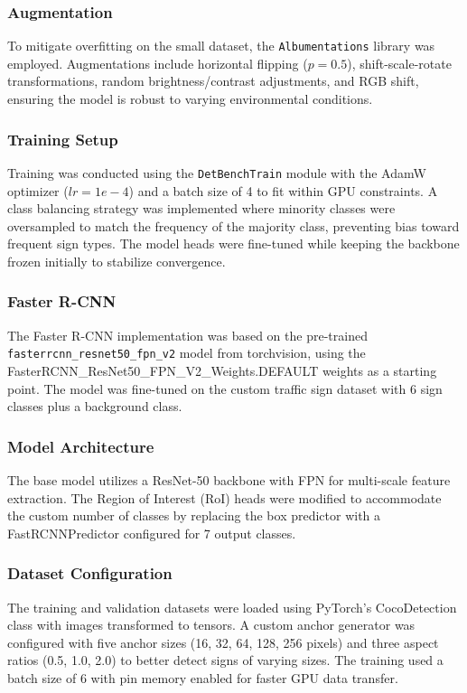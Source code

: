\documentclass{article}
\begin{document}
\subsubsection*{Augmentation}
To mitigate overfitting on the small dataset, the \texttt{Albumentations} library was employed. Augmentations include horizontal flipping ($p=0.5$), shift-scale-rotate transformations, random brightness/contrast adjustments, and RGB shift, ensuring the model is robust to varying environmental conditions.

\subsubsection*{Training Setup}
Training was conducted using the \texttt{DetBenchTrain} module with the AdamW optimizer ($lr=1e-4$) and a batch size of 4 to fit within GPU constraints. A class balancing strategy was implemented where minority classes were oversampled to match the frequency of the majority class, preventing bias toward frequent sign types. The model heads were fine-tuned while keeping the backbone frozen initially to stabilize convergence.

\subsubsection{Faster R-CNN}

The Faster R-CNN implementation was based on the pre-trained \texttt{fasterrcnn\_resnet50\_fpn\_v2} model from torchvision, using the FasterRCNN\_ResNet50\_FPN\_V2\_Weights.DEFAULT weights as a starting point. The model was fine-tuned on the custom traffic sign dataset with 6 sign classes plus a background class.

\subsubsection*{Model Architecture}
The base model utilizes a ResNet-50 backbone with FPN for multi-scale feature extraction. The Region of Interest (RoI) heads were modified to accommodate the custom number of classes by replacing the box predictor with a FastRCNNPredictor configured for 7 output classes.

\subsubsection*{Dataset Configuration}
The training and validation datasets were loaded using PyTorch's CocoDetection class with images transformed to tensors. A custom anchor generator was configured with five anchor sizes (16, 32, 64, 128, 256 pixels) and three aspect ratios (0.5, 1.0, 2.0) to better detect signs of varying sizes. The training used a batch size of 6 with pin memory enabled for faster GPU data transfer.
\end{document}
